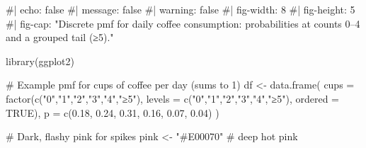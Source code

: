 \documentclass[
  letterpaper,
  DIV=11,
  numbers=noendperiod]{scrreprt}
\newenvironment{Shaded}{\begin{snugshade}}{\end{snugshade}}
\newcommand{\AttributeTok}[1]{\textcolor[rgb]{0.40,0.45,0.13}{#1}}
\newcommand{\CommentTok}[1]{\textcolor[rgb]{0.37,0.37,0.37}{#1}}
\newcommand{\ConstantTok}[1]{\textcolor[rgb]{0.56,0.35,0.01}{#1}}
\newcommand{\FloatTok}[1]{\textcolor[rgb]{0.68,0.00,0.00}{#1}}
\newcommand{\FunctionTok}[1]{\textcolor[rgb]{0.28,0.35,0.67}{#1}}
\newcommand{\NormalTok}[1]{\textcolor[rgb]{0.00,0.23,0.31}{#1}}
\newcommand{\OtherTok}[1]{\textcolor[rgb]{0.00,0.23,0.31}{#1}}
\newcommand{\StringTok}[1]{\textcolor[rgb]{0.13,0.47,0.30}{#1}}
\begin{document}
\begin{Shaded}
\begin{Highlighting}[]
\CommentTok{\#| echo: false}
\CommentTok{\#| message: false}
\CommentTok{\#| warning: false}
\CommentTok{\#| fig{-}width: 8}
\CommentTok{\#| fig{-}height: 5}
\CommentTok{\#| fig{-}cap: "Discrete pmf for daily coffee consumption: probabilities at counts 0–4 and a grouped tail (≥5)."}

\FunctionTok{library}\NormalTok{(ggplot2)}

\CommentTok{\# Example pmf for cups of coffee per day (sums to 1)}
\NormalTok{df }\OtherTok{\textless{}{-}} \FunctionTok{data.frame}\NormalTok{(}
  \AttributeTok{cups =} \FunctionTok{factor}\NormalTok{(}\FunctionTok{c}\NormalTok{(}\StringTok{"0"}\NormalTok{,}\StringTok{"1"}\NormalTok{,}\StringTok{"2"}\NormalTok{,}\StringTok{"3"}\NormalTok{,}\StringTok{"4"}\NormalTok{,}\StringTok{"≥5"}\NormalTok{),}
                \AttributeTok{levels =} \FunctionTok{c}\NormalTok{(}\StringTok{"0"}\NormalTok{,}\StringTok{"1"}\NormalTok{,}\StringTok{"2"}\NormalTok{,}\StringTok{"3"}\NormalTok{,}\StringTok{"4"}\NormalTok{,}\StringTok{"≥5"}\NormalTok{), }\AttributeTok{ordered =} \ConstantTok{TRUE}\NormalTok{),}
  \AttributeTok{p =} \FunctionTok{c}\NormalTok{(}\FloatTok{0.18}\NormalTok{, }\FloatTok{0.24}\NormalTok{, }\FloatTok{0.31}\NormalTok{, }\FloatTok{0.16}\NormalTok{, }\FloatTok{0.07}\NormalTok{, }\FloatTok{0.04}\NormalTok{)}
\NormalTok{)}

\CommentTok{\# Dark, flashy pink for spikes}
\NormalTok{pink }\OtherTok{\textless{}{-}} \StringTok{"\#E00070"}  \CommentTok{\# deep hot pink}


\end{Highlighting}
\end{Shaded}
\end{document}
